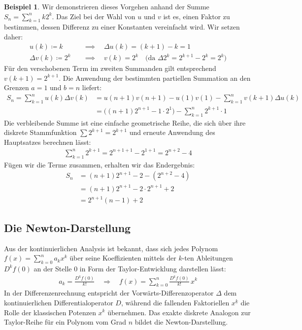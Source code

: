 \documentclass{article}
\theoremstyle{definition}
\newtheorem{bsp}[thm]{Beispiel}
\begin{document}
\begin{bsp}
Wir demonstrieren dieses Vorgehen anhand der Summe $S_n = \sum_{k=1}^{n} k 2^k$. 
Das Ziel bei der Wahl von $u$ und $v$ ist es, einen Faktor zu bestimmen, dessen Differenz zu einer Konstanten vereinfacht wird. Wir setzen daher:
\begin{align*}
    u(k) \coloneqq k \quad &\implies \quad \Delta u(k) = (k+1) - k = 1 \\
    \Delta v(k) \coloneqq 2^k \quad &\implies \quad v(k) = 2^k \quad \Big(\text{da } \Delta 2^k = 2^{k+1} - 2^k = 2^k\Big)
\end{align*}
Für den verschobenen Term im zweiten Summanden gilt entsprechend $v(k+1) = 2^{k+1}$. Die Anwendung der bestimmten partiellen Summation an den Grenzen $a=1$ und $b=n$ liefert:
\begin{align*}
    S_n = \sum_{k=1}^{n} u(k)\Delta v(k) &= u(n+1)v(n+1) - u(1)v(1) - \sum_{k=1}^{n} v(k+1)\Delta u(k) \\
    &= \Big( (n+1)2^{n+1} - 1 \cdot 2^1 \Big) - \sum_{k=1}^{n} 2^{k+1} \cdot 1
\end{align*}
Die verbleibende Summe ist eine einfache geometrische Reihe, die sich über ihre diskrete Stammfunktion $\sum 2^{k+1} = 2^{k+1}$ und erneute Anwendung des Hauptsatzes berechnen lässt:
\begin{align*}
    \sum_{k=1}^{n} 2^{k+1} = 2^{n+1+1} - 2^{1+1} = 2^{n+2} - 4
\end{align*}
Fügen wir die Terme zusammen, erhalten wir das Endergebnis:
\begin{align*}
    S_n &= (n+1)2^{n+1} - 2 - (2^{n+2} - 4) \\
    &= (n+1)2^{n+1} - 2 \cdot 2^{n+1} + 2 \\
    &= 2^{n+1}(n - 1) + 2
\end{align*}
\end{bsp}

\subsection{Die Newton-Darstellung}
Aus der kontinuierlichen Analysis ist bekannt, dass sich jedes Polynom $f(x) = \sum_{k=0}^{n} a_k x^k$ über seine Koeffizienten mittels der $k$-ten Ableitungen $D^k f(0)$ an der Stelle $0$ in Form der Taylor-Entwicklung darstellen lässt:
\begin{align*}
    a_k = \frac{D^k f(0)}{k!} \quad \Longrightarrow \quad f(x) = \sum_{k=0}^{n} \frac{D^k f(0)}{k!}\, x^k
\end{align*}
In der Differenzenrechnung entspricht der Vorwärts-Differenzoperator $\Delta$ dem kontinuierlichen Differentialoperator $D$, während die fallenden Faktoriellen $x^{\underline{k}}$ die Rolle der klassischen Potenzen $x^k$ übernehmen. Das exakte diskrete Analogon zur Taylor-Reihe für ein Polynom vom Grad $n$ bildet die Newton-Darstellung.
\end{document}
